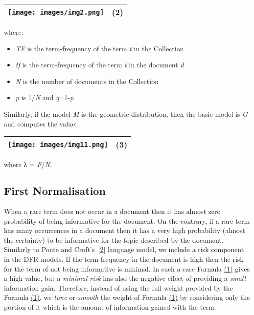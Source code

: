 \begin{longtable}[]{@{}ll@{}}
\toprule
\texttt{[image: images/img2.png]} &
(2)\tabularnewline
\bottomrule
\end{longtable}

where:

\begin{itemize}
\tightlist
\item
  \emph{TF} is the term-frequency of the term \emph{t} in the Collection
\item
  \emph{tf} is the term-frequency of the term \emph{t} in the document
  \emph{d}
\item
  \emph{N} is the number of documents in the Collection
\item
  \emph{p} is 1/\emph{N} and \emph{q}=1-\emph{p}
\end{itemize}

Similarly, if the model \emph{M} is the geometric distribution, then the
basic model is \emph{G} and computes the value:

\href{}{}

\begin{longtable}[]{@{}ll@{}}
\toprule
\texttt{[image: images/img11.png]} &
(3)\tabularnewline
\bottomrule
\end{longtable}

where λ = \emph{F}/\emph{N}.

\href{}{}

\subsection{First Normalisation}\label{first-normalisation}

When a rare term does not occur in a document then it has almost zero
probability of being informative for the document. On the contrary, if a
rare term has many occurrences in a document then it has a very high
probability (almost the certainty) to be informative for the topic
described by the document. Similarly to Ponte and
Croft's~{[}\protect\hyperlink{2}{2}{]} language model, we include a risk
component in the DFR models. If the term-frequency in the document is
high then the risk for the term of not being informative is minimal. In
such a case Formula \protect\hyperlink{Formula:basic}{(1)} gives a high
value, but a \emph{minimal risk} has also the negative effect of
providing a \emph{small} information gain. Therefore, instead of using
the full weight provided by the Formula
\protect\hyperlink{Formula:basic}{(1)}, we \emph{tune} or \emph{smooth}
the weight of Formula \protect\hyperlink{Formula:basic}{(1)} by
considering only the portion of it which is the amount of information
gained with the term:

